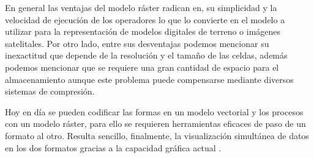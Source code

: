 En general las ventajas del modelo ráster radican en, su simplicidad y la velocidad de ejecución de
los operadores lo que lo convierte en el modelo a utilizar para la representación de modelos
digitales de terreno o imágenes satelitales. Por otro lado, entre sus desventajas podemos
mencionar su inexactitud que depende de la resolución y el tamaño de las celdas, además podemos
mencionar que se requiere una gran cantidad de espacio para el almacenamiento aunque este problema
puede compensarse mediante diversos sistemas de compresión.

Hoy en día se pueden codificar las formas en un modelo vectorial y los procesos con un modelo
ráster, para ello se requieren herramientas eficaces de paso de un formato al otro. Resulta
sencillo, finalmente, la visualización simultánea de datos en los dos formatos gracias a la
capacidad gráfica actual \cite{fAlonsoSig2006}.
